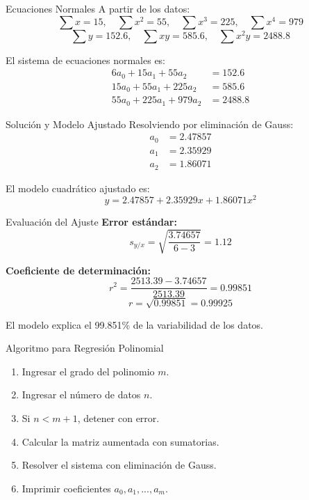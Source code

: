 \documentclass[main.tex]{subfiles}
\begin{document}
\begin{frame}{Ecuaciones Normales}
  \small
  A partir de los datos:
  \[
  \sum x = 15,\quad \sum x^2 = 55,\quad \sum x^3 = 225,\quad \sum x^4 = 979
  \]
  \[
  \sum y = 152.6,\quad \sum x y = 585.6,\quad \sum x^2 y = 2488.8
  \]

  El sistema de ecuaciones normales es:
  \[
  \begin{aligned}
  6 a_0 + 15 a_1 + 55 a_2 &= 152.6 \\
  15 a_0 + 55 a_1 + 225 a_2 &= 585.6 \\
  55 a_0 + 225 a_1 + 979 a_2 &= 2488.8
  \end{aligned}
  \]
\end{frame}

\begin{frame}{Solución y Modelo Ajustado}
  Resolviendo por eliminación de Gauss:
  \[
  \begin{aligned}
  a_0 &= 2.47857 \\
  a_1 &= 2.35929 \\
  a_2 &= 1.86071
  \end{aligned}
  \]

  El modelo cuadrático ajustado es:
  \[
  y = 2.47857 + 2.35929x + 1.86071x^2
  \]
\end{frame}

\begin{frame}{Evaluación del Ajuste}
  \small
  \textbf{Error estándar:}
  \[
  s_{y/x} = \sqrt{ \frac{3.74657}{6 - 3} } = 1.12
  \]

  \textbf{Coeficiente de determinación:}
  \[
  r^2 = \frac{2513.39 - 3.74657}{2513.39} = 0.99851
  \]
  \[
  r = \sqrt{0.99851} = 0.99925
  \]

  El modelo explica el 99.851\% de la variabilidad de los datos.
\end{frame}

\begin{frame}{Algoritmo para Regresión Polinomial}
  \begin{enumerate}
    \item Ingresar el grado del polinomio \(m\).
    \item Ingresar el número de datos \(n\).
    \item Si \(n < m + 1\), detener con error.
    \item Calcular la matriz aumentada con sumatorias.
    \item Resolver el sistema con eliminación de Gauss.
    \item Imprimir coeficientes \(a_0, a_1, ..., a_m\).
  \end{enumerate}
\end{frame}
\end{document}
